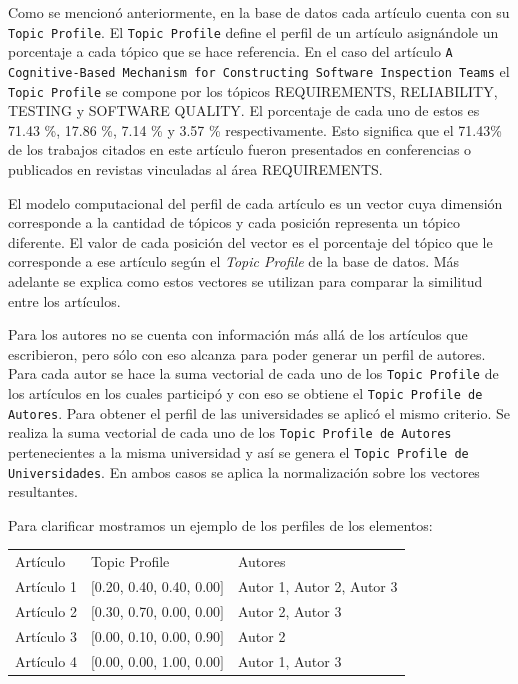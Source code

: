 Como se mencionó anteriormente, en la base de datos cada artículo cuenta con su \texttt{Topic Profile}. El \texttt{Topic Profile} define el perfil de un artículo asignándole un porcentaje a cada tópico que se hace referencia. En el caso del artículo \texttt{A Cognitive-Based Mechanism for Constructing Software Inspection Teams} el \texttt{Topic Profile} se compone por los tópicos  REQUIREMENTS, RELIABILITY, TESTING y SOFTWARE QUALITY. El porcentaje de cada uno de estos es 71.43 \%, 17.86 \%, 7.14 \% y 3.57 \% respectivamente. Esto significa que el 71.43\% de los trabajos citados en este artículo fueron presentados en conferencias o publicados en revistas vinculadas al área REQUIREMENTS.

El modelo computacional del perfil de cada artículo es un vector cuya dimensión corresponde a la cantidad de tópicos y cada posición representa un tópico diferente. El valor de cada posición del vector es el porcentaje del tópico que le corresponde a ese artículo según el \textit{Topic Profile} de la base de datos. Más adelante se explica como estos vectores se utilizan para comparar la similitud entre los artículos.

Para los autores no se cuenta con información más allá de los artículos que escribieron, pero sólo con eso alcanza para poder generar un perfil de autores. Para cada autor se hace la suma vectorial de cada uno de los \texttt{Topic Profile} de los artículos en los cuales participó y con eso se obtiene el \texttt{Topic Profile de Autores}. Para obtener el perfil de las universidades se aplicó el mismo criterio. Se realiza la suma vectorial de cada uno de los \texttt{Topic Profile de Autores} pertenecientes a la misma universidad y así se genera el \texttt{Topic Profile de Universidades}. En ambos casos se aplica la normalización sobre los vectores resultantes.

Para clarificar mostramos un ejemplo de los perfiles de los elementos:

\begin{table}[H]
\begin{tabular}{lll}
	Artículo & Topic Profile & Autores \\
	Artículo 1 & $[$0.20, 0.40, 0.40, 0.00$]$ & Autor 1, Autor 2, Autor 3 \\
	Artículo 2 & $[$0.30, 0.70, 0.00, 0.00$]$ & Autor 2, Autor 3 \\
	Artículo 3 & $[$0.00, 0.10, 0.00, 0.90$]$ & Autor 2 \\
	Artículo 4 & $[$0.00, 0.00, 1.00, 0.00$]$ & Autor 1, Autor 3 \\
\end{tabular}
\label{tabla:topicProfileEj1}
\end{table}

